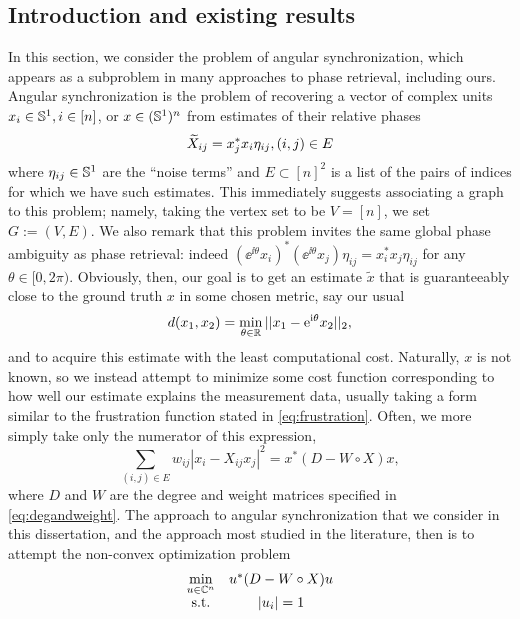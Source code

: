 \subsection{Introduction and existing results}
In this section, we consider the problem of angular synchronization, which appears as a subproblem in many approaches to phase retrieval, including ours.  Angular synchronization is the problem of recovering a vector of complex units $x_i \in \mathbb{S}^1, i \in [n]$, or $x \in (\mathbb{S}^1)^n$ from estimates of their relative phases \[\widetilde{X}_{ij} = x_j^* x_i \eta_{ij}, (i, j) \in E\] where $\eta_{ij} \in \mathbb{S}^1$ are the ``noise terms'' and $E \subset [n]^2$ is a list of the pairs of indices for which we have such estimates.  This immediately suggests associating a graph to this problem; namely, taking the vertex set to be $V = [n]$, we set $G := (V, E)$.  We also remark that this problem invites the same global phase ambiguity as phase retrieval: indeed $(\ee^{\ii \theta} x_i)^* (\ee^{\ii \theta} x_j) \eta_{ij} = x_i^* x_j \eta_{ij}$ for any $\theta \in [0, 2\pi)$.  Obviously, then, our goal is to get an estimate $\tilde{x}$ that is guaranteeably close to the ground truth $x$ in some chosen metric, say our usual \[d(x_1, x_2) = \min_{\theta \in \mathbb{R}} || x_1 - \mathrm{e}^{\mathrm{i} \theta} x_2 ||_2,\] and to acquire this estimate with the least computational cost.  Naturally, $x$ is not known, so we instead attempt to minimize some cost function corresponding to how well our estimate explains the measurement data, usually taking a form similar to the frustration function stated in \eqref{eq:frustration}.  Often, we more simply take only the numerator of this expression, \[\sum_{(i, j) \in E} w_{ij} |x_i - X_{ij} x_j|^2 = x^* (D - W \circ X) x, \label{eq:ang_sync_cost}\] where $D$ and $W$ are the degree and weight matrices specified in \eqref{eq:degandweight}.  The approach to angular synchronization that we consider in this dissertation, and the approach most studied in the literature, then is to attempt the non-convex optimization problem \begin{equation} \begin{array}{cc} \min\limits_{u \in \mathbb{C}^n} & u^* (D - W \circ X) u \\ \text{s.t.} & |u_i| = 1 \end{array} \label{eq:ang_sync }\end{equation}

